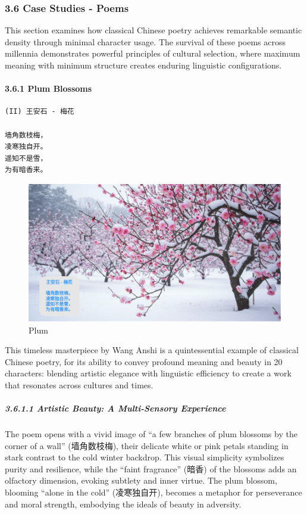 \documentclass[
  11pt,
  letterpaper,
]{article}
\begin{document}
\subsubsection{3.6 Case Studies - Poems}\label{case-studies---poems}

This section examines how classical Chinese poetry achieves remarkable
semantic density through minimal character usage. The survival of these
poems across millennia demonstrates powerful principles of cultural
selection, where maximum meaning with minimum structure creates enduring
linguistic configurations.

\paragraph{3.6.1 Plum Blossoms}\label{plum-blossoms}

\begin{verbatim}
(II) 王安石 - 梅花

墙角数枝梅，
凌寒独自开。
遥知不是雪，
为有暗香来。
\end{verbatim}

\begin{figure}
\centering
\includegraphics{./images/poem_plum.png}
\caption{Plum}
\end{figure}

This timeless masterpiece by Wang Anshi is a quintessential example of
classical Chinese poetry, for its ability to convey profound meaning and
beauty in 20 characters: blending artistic elegance with linguistic
efficiency to create a work that resonates across cultures and times.

\subparagraph{3.6.1.1 Artistic Beauty: A Multi-Sensory
Experience}\label{artistic-beauty-a-multi-sensory-experience}

The poem opens with a vivid image of ``a few branches of plum blossoms
by the corner of a wall'' (墙角数枝梅), their delicate white or pink
petals standing in stark contrast to the cold winter backdrop. This
visual simplicity symbolizes purity and resilience, while the ``faint
fragrance'' (暗香) of the blossoms adds an olfactory dimension, evoking
subtlety and inner virtue. The plum blossom, blooming ``alone in the
cold'' (凌寒独自开), becomes a metaphor for perseverance and moral
strength, embodying the ideals of beauty in adversity.
\end{document}
